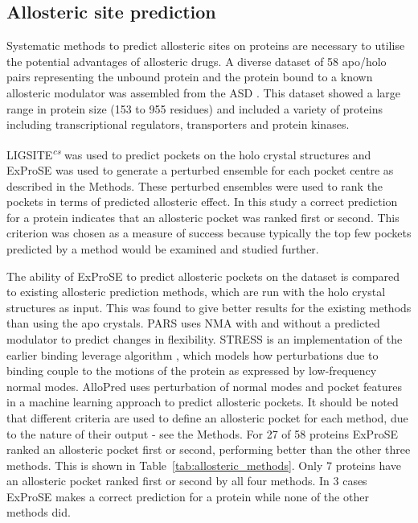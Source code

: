 \subsection{Allosteric site prediction}

Systematic methods to predict allosteric sites on proteins are necessary to utilise the potential advantages of allosteric drugs.
A diverse dataset of 58 apo/holo pairs representing the unbound protein and the protein bound to a known allosteric modulator was assembled from the ASD \cite{Shen2016}.
This dataset showed a large range in protein size (153 to 955 residues) and included a variety of proteins including transcriptional regulators, transporters and protein kinases.

LIGSITE\textsuperscript{\it cs} was used to predict pockets on the holo crystal structures and ExProSE was used to generate a perturbed ensemble for each pocket centre as described in the Methods.
These perturbed ensembles were used to rank the pockets in terms of predicted allosteric effect.
In this study a correct prediction for a protein indicates that an allosteric pocket was ranked first or second.
This criterion was chosen as a measure of success because typically the top few pockets predicted by a method would be examined and studied further.

The ability of ExProSE to predict allosteric pockets on the dataset is compared to existing allosteric prediction methods, which are run with the holo crystal structures as input.
This was found to give better results for the existing methods than using the apo crystals.
PARS \cite{Panjkovich2014} uses NMA with and without a predicted modulator to predict changes in flexibility.
STRESS \cite{Clarke2016} is an implementation of the earlier binding leverage algorithm \cite{Mitternacht2011}, which models how perturbations due to binding couple to the motions of the protein as expressed by low-frequency normal modes.
AlloPred \cite{Greener2015} uses perturbation of normal modes and pocket features in a machine learning approach to predict allosteric pockets.
It should be noted that different criteria are used to define an allosteric pocket for each method, due to the nature of their output - see the Methods.
For 27 of 58 proteins ExProSE ranked an allosteric pocket first or second, performing better than the other three methods.
This is shown in Table~\ref{tab:allosteric_methods}.
Only 7 proteins have an allosteric pocket ranked first or second by all four methods.
In 3 cases ExProSE makes a correct prediction for a protein while none of the other methods did.

